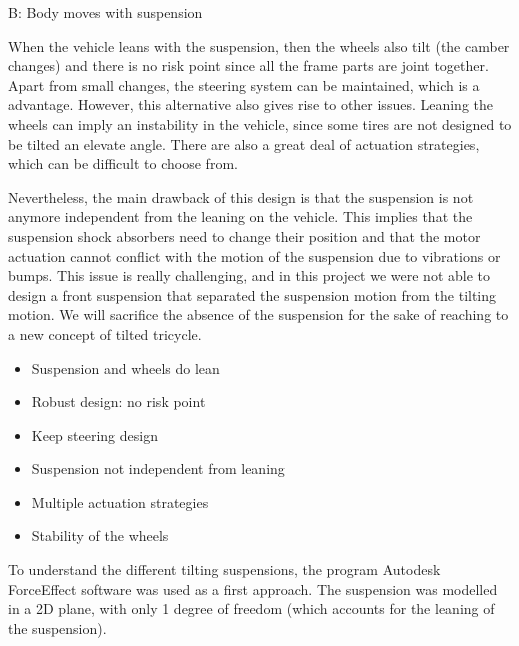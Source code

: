 \newpage
\textcolor{RubineRed}{B: Body moves with suspension}

When the vehicle leans with the suspension, then the wheels also tilt (the camber changes) and there is no risk point since all the frame parts are joint together. Apart from small changes, the steering system can be maintained, which is a advantage. However, this alternative also gives rise to other issues. Leaning the wheels can imply an instability in the vehicle, since some tires are not designed to be tilted an elevate angle. There are also a great deal of actuation strategies, which can be difficult to choose from. 

Nevertheless, the main drawback of this design is that the suspension is not anymore independent from the leaning on the vehicle. This implies that the suspension shock absorbers need to change their position and that the motor actuation cannot conflict with the motion of the suspension due to vibrations or bumps. This issue is really challenging, and in this project we were not able to design a front suspension that separated the suspension motion from the tilting motion. We will sacrifice the absence of the suspension for the sake of reaching to a new concept of tilted tricycle.
\begin{itemize}
\begin{itemize}\itemsep -10pt
    \item[$\textcolor{Green}{\surd}$] Suspension and wheels do lean
    \item[$\textcolor{Green}{\surd}$] Robust design: no risk point
    \item[$\textcolor{Green}{\surd}$] Keep steering design
\end{itemize}
\end{itemize}

\begin{itemize}
\begin{itemize}\itemsep -10pt
    \item[$\textcolor{Red}{\times}$] Suspension not independent from leaning
    \item[$\textcolor{Red}{\times}$] Multiple actuation strategies
    \item[$\textcolor{Red}{\times}$] Stability of the wheels
\end{itemize}
\end{itemize}

To understand the different tilting suspensions, the program Autodesk ForceEffect software was used as a first approach. The suspension was modelled in a 2D plane, with only 1 degree of freedom (which accounts for the leaning of the suspension). 


